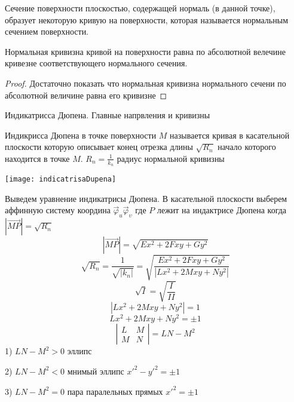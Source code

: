 \begin{define}
  Сечение поверхности плоскостью, содержащей нормаль (в данной точке), образует
  некоторую кривую на поверхности, которая называется нормальным сечением
  поверхности.
\end{define}

\begin{theorem}
  Нормальная кривизна кривой на поверхности равна по абсолютной велечине
  кривезне соответствующего нормального сечения.
\end{theorem}

\begin{proof}
  Достаточно показать что нормальная кривизна нормального сечени по
  абсолютной величине равна его кривизне
\end{proof}

\begin{title}[\Large]
  Индикатрисса Дюпена. Главные напрвления и кривизны
\end{title}

\begin{define}
  Индикрисса Дюпена в точке поверхности $M$ называется кривая в касательной
  плоскости которую описывает конец отрезка длины $\sqrt{R_n}$ начало
  которого находится в точке $M$. $R_n = \frac{1}{k_n}$ радиус нормальной
  кривизны

  \texttt{[image: indicatrisaDupena]}
\end{define}

\begin{block}
  Выведем уравнение индикатрисы Дюпена. В касательной плоскости выберем аффинную
  систему координа $\vec \varphi_u \vec \varphi_{\upsilon}$ где $P$ лежит на
  индактрисе Дюпена когда $|\overrightarrow{MP}| = \sqrt{R_n}$
  $$
  |\overrightarrow{MP}| = \sqrt{Ex^2 + 2Fxy + Gy^2}
  $$
  $$
  \sqrt{R_n} = \frac{1}{\sqrt{|k_n|}} = \sqrt{\frac{Ex^2 + 2Fxy + Gy^2}{
  |Lx^2 + 2Mxy + Ny^2|}}
  $$
  $$\sqrt{I} = \sqrt{\frac{I}{II}}
  $$
  $$
  |Lx^2 + 2Mxy + Ny^2| = 1
  $$
  $$
  Lx^2 + 2Mxy + Ny^2 = \pm 1
  $$
  $$
  \left|
  \begin{array}{cc}
    L & M \\
    M & N
  \end{array}
  \right| = LN - M^2
  $$
  1) $LN - M^2 > 0$ эллипс

  2) $LN - M^2 < 0$ мнимый эллипс $x'^2 - y'^2 = \pm 1$

  3) $LN - M^2 = 0$ пара паралельных прямых $x'^2 = \pm 1$
\end{block}

